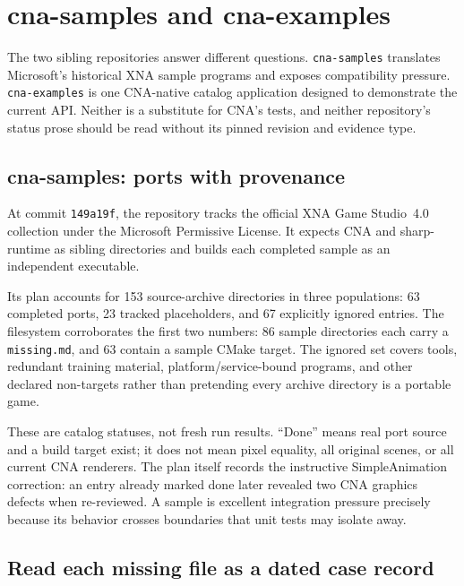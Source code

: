 \chapter{cna-samples and cna-examples}
\label{ch:samples-and-examples}

The two sibling repositories answer different questions.  \texttt{cna-samples} translates
Microsoft's historical XNA sample programs and exposes compatibility pressure.  \texttt{cna-examples}
is one CNA-native catalog application designed to demonstrate the current API.  Neither is a
substitute for CNA's tests, and neither repository's status prose should be read without its pinned
revision and evidence type.

\section{cna-samples: ports with provenance}

At commit \texttt{149a19f}, the repository tracks the official XNA Game Studio~4.0 collection
under the Microsoft Permissive License.  It expects CNA and sharp-runtime as sibling directories
and builds each completed sample as an independent executable.

Its plan accounts for 153 source-archive directories in three populations: 63 completed ports,
23 tracked placeholders, and 67 explicitly ignored entries.  The filesystem corroborates the
first two numbers: 86 sample directories each carry a \texttt{missing.md}, and 63 contain a sample
CMake target.  The ignored set covers tools, redundant training material, platform/service-bound
programs, and other declared non-targets rather than pretending every archive directory is a
portable game.

These are catalog statuses, not fresh run results.  ``Done'' means real port source and a build
target exist; it does not mean pixel equality, all original scenes, or all current CNA renderers.
The plan itself records the instructive SimpleAnimation correction: an entry already marked done
later revealed two CNA graphics defects when re-reviewed.  A sample is excellent integration
pressure precisely because its behavior crosses boundaries that unit tests may isolate away.

\section{Read each missing file as a dated case record}

